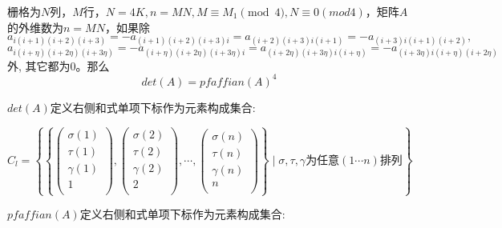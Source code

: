 \documentclass{amsc}          %
\numberwithin{equation}{section} %
\begin{document}
\begin{theorem}
栅格为$N$列，$M$行，$N = 4K,n=MN,M \equiv M_{1} \pmod{4},N \equiv 0 (mod 4)$，矩阵$A$的外维数为$n=MN$，如果除$$a_{i(i+1)(i+2)(i+3)}=-a_{(i+1)(i+2)(i+3)i}=a_{(i+2)(i+3)i(i+1)}=-a_{(i+3)i(i+1)(i+2)},$$$$a_{i(i+\eta)(i+2\eta)(i+3\eta)}=-a_{(i+\eta)(i+2\eta)(i+3\eta)i}=a_{(i+2\eta)(i+3\eta)i(i+\eta)}=-a_{(i+3\eta)i(i+\eta)(i+2\eta)}$$ 外, 其它都为0。那么$$det(A)=pfaffian(A)^{4}$$
\end{theorem}

\begin{prof}


$det(A)$定义右侧和式单项下标作为元素构成集合:

\begin{equation}\label{7}
C_{l} = \left\{
\left\{
\left(                 %
  \begin{array}{ccc}   %
    \sigma(1) \\  %
    \tau(1) \\  %
    \gamma(1)\\
    1\\
  \end{array}
  \right),
  \left(
  \begin{array}{ccc}   %
    \sigma(2) \\  %
    \tau(2) \\  %
    \gamma(2)\\
    2\\
  \end{array}
    \right),
\cdots     ,       %
  \left(
  \begin{array}{ccc}   %
    \sigma(n) \\  %
    \tau(n) \\  %
    \gamma(n)\\
    n\\
  \end{array}
\right)
\right\}
\mid \sigma,\tau,\gamma \text{为任意}(1 \cdots n)\text{排列}\right\}
\end{equation}

$pfaffian(A)$定义右侧和式单项下标作为元素构成集合:


\end{prof}
\end{document}
